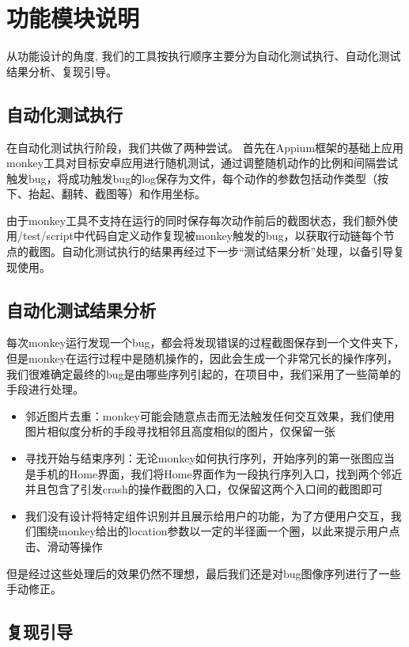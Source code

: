 \section{功能模块说明}
从功能设计的角度, 我们的工具按执行顺序主要分为自动化测试执行、自动化测试结果分析、复现引导。

\subsection{自动化测试执行}
在自动化测试执行阶段，我们共做了两种尝试。
首先在Appium框架的基础上应用monkey工具对目标安卓应用进行随机测试，通过调整随机动作的比例和间隔尝试触发bug，将成功触发bug的log保存为文件，每个动作的参数包括动作类型（按下、抬起、翻转、截图等）和作用坐标。

由于monkey工具不支持在运行的同时保存每次动作前后的截图状态，我们额外使用/test/script中代码自定义动作复现被monkey触发的bug，以获取行动链每个节点的截图。自动化测试执行的结果再经过下一步“测试结果分析”处理，以备引导复现使用。

\subsection{自动化测试结果分析}
每次monkey运行发现一个bug，都会将发现错误的过程截图保存到一个文件夹下，但是monkey在运行过程中是随机操作的，因此会生成一个非常冗长的操作序列，我们很难确定最终的bug是由哪些序列引起的，在项目中，我们采用了一些简单的手段进行处理。
\begin{itemize}
    \item 邻近图片去重：monkey可能会随意点击而无法触发任何交互效果，我们使用图片相似度分析的手段寻找相邻且高度相似的图片，仅保留一张
    \item 寻找开始与结束序列：无论monkey如何执行序列，开始序列的第一张图应当是手机的Home界面，我们将Home界面作为一段执行序列入口，找到两个邻近并且包含了引发crash的操作截图的入口，仅保留这两个入口间的截图即可
    \item 我们没有设计将特定组件识别并且展示给用户的功能，为了方便用户交互，我们围绕monkey给出的location参数以一定的半径画一个圈，以此来提示用户点击、滑动等操作
\end{itemize}

但是经过这些处理后的效果仍然不理想，最后我们还是对bug图像序列进行了一些手动修正。



\subsection{复现引导}
